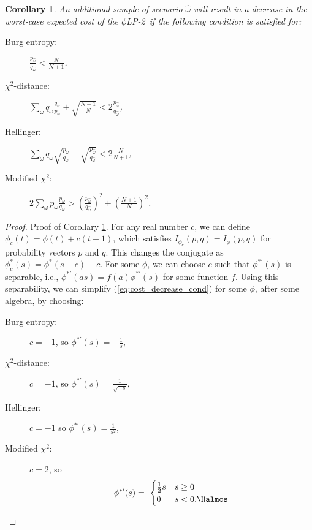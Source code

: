 \documentclass[12pt]{article}
\theoremstyle{plain}
\newtheorem{corollary}[theorem]{Corollary}
\theoremstyle{definition}
\theoremstyle{remark}
\newtheorem{remark}[theorem]{Remark}
\newcommand{\plp}{$\phi$LP-2}
\begin{document}
\begin{corollary}
	\label{cor:cost_decrease_trick}
	An additional sample of scenario $\hat{\omega}$ will result in a decrease in the worst-case expected cost of the \plp\ if the following condition is satisfied for:\vspace*{-0.1in}
	\begin{multicols}{2}
		\begin{description}
			\item[Burg entropy:] $\frac{p_{\hat{\omega}}}{q_{\hat{\omega}}} < \frac{N}{N+1}$, %
			\item[$\chi^2$-distance:]  $\sum_\omega q_\omega \frac{q_\omega}{p_\omega} + \sqrt{\frac{N+1}{N}} < 2 \frac{p_{\hat{\omega}}}{q_{\hat{\omega}}}$,
			\item[Hellinger:] $\sum_\omega q_\omega \sqrt{\frac{p_\omega}{q_\omega}} + \sqrt{\frac{p_{\hat{\omega}}}{q_{\hat{\omega}}}} < 2 \frac{N}{N+1}$,
			\item[Modified $\chi^2$:] $2 \sum_\omega p_\omega \frac{p_\omega}{q_\omega} > \left(\frac{p_{\hat{\omega}}}{q_{\hat{\omega}}}\right)^2 + \left(\frac{N+1}{N}\right)^2$.
		\end{description}
	\end{multicols}
\end{corollary}

\begin{proof}{\sc Proof of Corollary \ref{cor:cost_decrease_trick}.}
	For any real number $c$, we can define $\phi_c(t) = \phi(t) + c(t-1)$, which satisfies $I_{\phi_c}(p,q) = I_\phi(p,q)$ for probability vectors $p$ and $q$.
	This changes the conjugate as $\phi_c^*(s) = \phi^*(s-c) + c$.
	For some $\phi$, we can choose $c$ such that $\phi^{*\prime}(s)$ is separable, i.e., $\phi^{*\prime}(as) = f(a) \phi^{*\prime}(s)$ for some function $f$.
	Using this separability, we can simplify (\ref{eq:cost_decrease_cond}) for some $\phi$, after some algebra, by choosing:\vspace*{-0.15in}
	\begin{multicols}{2}
	\begin{description} 
		\item[Burg entropy:]  $c = -1$, so $\phi^{*\prime}(s) = -\frac{1}{s}$,
		\item[$\chi^2$-distance:] $c = -1$, so $\phi^{*\prime}(s) = \frac{1}{\sqrt{-s}}$,
		\item[Hellinger:]  $c = -1$ so $\phi^{*\prime}(s) = \frac{1}{s^2}$, 
		\item[Modified $\chi^2$:] $c = 2$, so
		\[
			\phi^{*\prime}(s) = \
			\begin{cases}
				\frac{1}{2} s & s \geq 0 \\
				0 & s < 0.   \Halmos
			\end{cases}
		\]
	\end{description}
	\end{multicols}
\end{proof}
\end{document}
